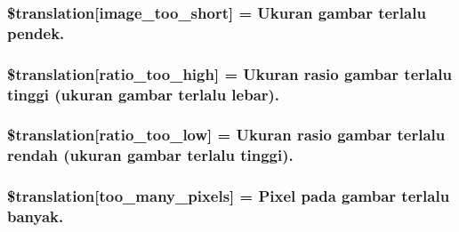 \subsubsection[{\$translation}]{\setlength{\rightskip}{0pt plus 5cm}\$translation\mbox{[}\textquotesingle{}image\+\_\+too\+\_\+short\textquotesingle{}\mbox{]} = \textquotesingle{}Ukuran gambar terlalu pendek.\textquotesingle{}}\label{class_8upload_8id___i_d_8php_a86fcd4e1157b00032df451188d735527}
\hypertarget{class_8upload_8id___i_d_8php_a23396f6ce7f31e5e5f1b57580621d982}{}
\subsubsection[{\$translation}]{\setlength{\rightskip}{0pt plus 5cm}\$translation\mbox{[}\textquotesingle{}ratio\+\_\+too\+\_\+high\textquotesingle{}\mbox{]} = \textquotesingle{}Ukuran rasio gambar terlalu tinggi (ukuran gambar terlalu lebar).\textquotesingle{}}\label{class_8upload_8id___i_d_8php_a23396f6ce7f31e5e5f1b57580621d982}
\hypertarget{class_8upload_8id___i_d_8php_ac533b9a479f056b0b8623e4268f068c2}{}
\subsubsection[{\$translation}]{\setlength{\rightskip}{0pt plus 5cm}\$translation\mbox{[}\textquotesingle{}ratio\+\_\+too\+\_\+low\textquotesingle{}\mbox{]} = \textquotesingle{}Ukuran rasio gambar terlalu rendah (ukuran gambar terlalu tinggi).\textquotesingle{}}\label{class_8upload_8id___i_d_8php_ac533b9a479f056b0b8623e4268f068c2}
\hypertarget{class_8upload_8id___i_d_8php_aa4051ef64e94a3f8295c63cf85544016}{}
\subsubsection[{\$translation}]{\setlength{\rightskip}{0pt plus 5cm}\$translation\mbox{[}\textquotesingle{}too\+\_\+many\+\_\+pixels\textquotesingle{}\mbox{]} = \textquotesingle{}Pixel pada gambar terlalu banyak.\textquotesingle{}}\label{class_8upload_8id___i_d_8php_aa4051ef64e94a3f8295c63cf85544016}
\hypertarget{class_8upload_8id___i_d_8php_a1fe342c27ce61f4ff4e0120ba647033e}{}
